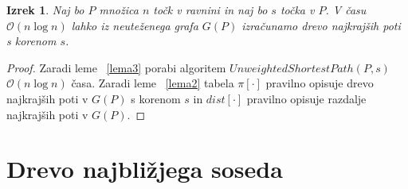 \documentclass[a4paper, 12pt]{book}
\newcommand{\OO}{\ensuremath{\mathcal{O}}} %
\newtheorem{izrek}{Izrek}[chapter]
\begin{document}
\begin{izrek}
Naj bo $P$ množica $n$ točk v ravnini in naj bo $s$ točka v $P$. V času $\OO(n\log n)$ lahko iz neuteženega grafa $G(P)$ izračunamo drevo najkrajših poti s korenom $s$.
\end{izrek}

\begin{proof}
Zaradi leme ~\ref{lema3} porabi algoritem $UnweightedShortestPath(P,s)$ $\OO(n\log n)$ časa. Zaradi leme ~\ref{lema2} tabela $\pi[\cdot]$ pravilno opisuje drevo najkrajših poti v $G(P)$ s korenom $s$ in $dist[\cdot]$ pravilno opisuje razdalje najkrajših poti v $G(P)$.
\end{proof}

\section{Drevo najbližjega soseda}
\end{document}
